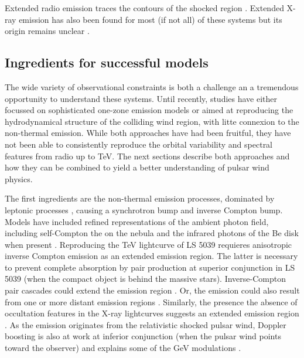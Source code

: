 Extended radio emission traces the contours of the shocked region \citep{2006smqw.confE..52D,2011ApJ...732L..10M}. Extended X-ray emission has also been found for most (if not all) of these systems but its origin remains unclear  \citep{2014AN....335..301K}. 




\subsection { Ingredients for successful models}


The wide variety of observational constraints is both a challenge an a tremendous opportunity to understand these systems.  Until recently, studies have either focussed on sophisticated one-zone emission models or aimed at reproducing the hydrodynamical  structure of the colliding wind region, with litte connexion to the non-thermal emission. While both approaches have had been fruitful, they have not been able to consistently reproduce the  orbital variability and spectral features from radio up to TeV.   The next sections describe both approaches and how they can be combined to yield a better understanding of pulsar wind physics.

The first ingredients are the non-thermal emission processes, dominated by leptonic processes \citep{2006A&A...456..801D}, causing a synchrotron bump and inverse Compton bump.  Models have included refined  representations of the ambient photon field, including self-Compton the on the nebula  \citep{2010A&A...519A..81C} and the infrared photons of the  Be disk when present  \citep{2012MNRAS.426.3135V}. Reproducing the TeV lightcurve of LS 5039 requieres anisotropic inverse Compton emission  \citep{2008A&A...477..691D} as an extended emission region. The latter is necessary to prevent complete absorption by pair production at  superior conjunction in LS 5039 (when the compact object is behind the massive stars).  Inverse-Compton pair cascades could extend the emission region \citep{2006MNRAS.371.1737B,2010A&A...519A..81C}. Or, the  emission could also result from one or more  distant emission regions \citep{2013A&A...551A..17Z}.  Similarly, the presence the absence of occultation features in the X-ray lightcurves suggests an extended emission region \citep{2007A&A...473..545B,2011MNRAS.411..193S}.  As the emission originates from the relativistic shocked pulsar wind, Doppler boosting is also at work at inferior conjunction (when the pulsar wind points toward the observer) and explains some of the GeV modulations \citep{2010A&A...516A..18D}. 


